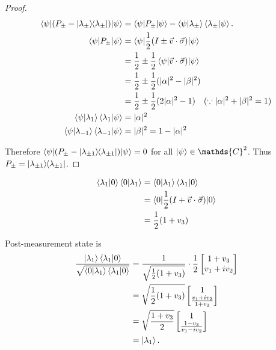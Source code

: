 \begin{proof}
		\begin{align*}
		\braket{\psi | (P_{\pm} - \ket{\lambda_\pm}\hspace{-1mm} \bra{\lambda_\pm})| \psi}
		&= \braket{\psi | P_\pm | \psi} - \braket{\psi | \lambda_\pm} \braket{\lambda_\pm | \psi}.\\
		\braket{\psi | P_\pm | \psi} &= \braket{\psi | \frac{1}{2}(I \pm \vec{v} \cdot \vec{\sigma}) | \psi}\\
		&= \frac{1}{2} \pm \frac{1}{2} \braket{\psi | \vec{v} \cdot \vec{\sigma})| \psi}\\
		&= \frac{1}{2} \pm \frac{1}{2} (|\alpha|^2 - |\beta|^2)\\
		&= \frac{1}{2} \pm \frac{1}{2} (2|\alpha|^2 - 1) ~~~(\because |\alpha|^2 + |\beta|^2 = 1)\\
		\braket{\psi | \lambda_1} \braket{\lambda_1 | \psi} &= |\alpha|^2\\
		\braket{\psi | \lambda_{-1}} \braket{\lambda_{-1}| \psi} &= |\beta|^2 = 1  - |\alpha|^2
		\end{align*}

		Therefore $\braket{\psi | (P_\pm - \ket{\lambda_{\pm 1}}\hspace{-1mm} \bra{\lambda_{\pm 1}})| \psi} = 0$ for all $\ket{\psi} \in \mathds{C}^2$.
		Thus $P_\pm = \ket{\lambda_{\pm 1}}\hspace{-1mm} \bra{\lambda_{\pm 1}}$.
	\end{proof}

\begin{align*}
	\braket{\lambda_1 | 0} \braket{0 | \lambda_1} &= \braket{0 | \lambda_1} \braket{\lambda_1 | 0}\\
		&= \braket{0 | \frac{1}{2} ( I + \vec{v} \cdot \vec{\sigma} ) | 0}\\
		&= \frac{1}{2} (1 + v_3)
\end{align*}

Post-measurement state is
\begin{align*}
	\frac{\ket{\lambda_1} \braket{\lambda_1 | 0}}{ \sqrt{\braket{0 | \lambda_1} \braket{\lambda_1 | 0}} } &= \frac{1}{\sqrt{\frac{1}{2} (1 + v_3)}}
	\cdot \frac{1}{2}
	\begin{bmatrix}
		1 + v_3 \\
		v_1 + iv_2
	\end{bmatrix} \\
		&= \sqrt{ \frac{1}{2}  (1 + v_3) } \begin{bmatrix}
		1 \\
		\frac{v_1 + iv_2}{1+v_3}
		\end{bmatrix} \\
		&=  \sqrt{ \frac{1 + v_3}{2} } \begin{bmatrix}
		1 \\
		\frac{1 - v_3}{v_1 - iv_2}
		\end{bmatrix} \\
		&= \ket{\lambda_1}.
\end{align*}



